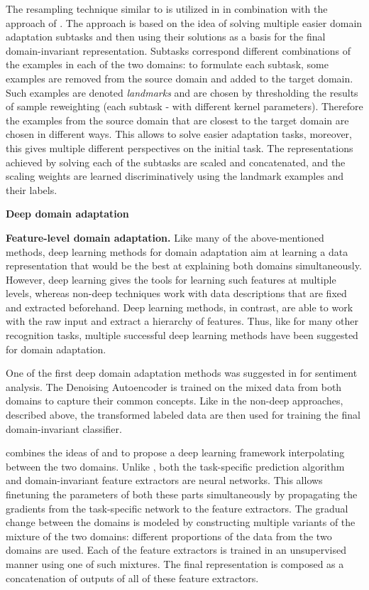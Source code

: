 The resampling technique similar to \citep{huang2007correcting} is utilized in \citep{gong2013connecting} in combination with the approach of \citep{gong2012geodesic}. The approach is based on the idea of solving multiple easier domain adaptation subtasks and then using their solutions as a basis for the final domain-invariant representation. Subtasks correspond different combinations of the examples in each of the two domains: to formulate each subtask, some examples are removed from the source domain and added to the target domain. Such examples are denoted \textit{landmarks} and are chosen by thresholding the results of sample reweighting (each subtask - with different kernel parameters). Therefore the examples from the source domain that are closest to the target domain are chosen in different ways. This allows to solve easier adaptation tasks, moreover, this gives multiple different perspectives on the initial task. The representations achieved by solving each of the subtasks are scaled and concatenated, and the scaling weights are learned discriminatively using the landmark examples and their labels.


\bigskip\ident\textbf{Deep domain adaptation}

\bigskip\ident\textbf{Feature-level domain adaptation.} Like many of the above-mentioned methods, deep learning methods for domain adaptation aim at learning a data representation that would be the best at explaining both domains simultaneously. However, deep learning gives the tools for learning such features at multiple levels, whereas non-deep techniques work with data descriptions that are fixed and extracted beforehand. Deep learning methods, in contrast, are able to work with the raw input and extract a hierarchy of features. Thus, like for many other recognition tasks, multiple successful deep learning methods have been suggested for domain adaptation. 

One of the first deep domain adaptation methods was suggested in \citep{glorot2011domain} for sentiment analysis. The Denoising Autoencoder \citep{vincent2008extracting} is trained on the mixed data from both domains to capture their common concepts. Like in the non-deep approaches, described above, the transformed labeled data are then used for training the final domain-invariant classifier.

\citep{chopra2013dlid} combines the ideas of \citep{gong2012geodesic} and \citep{glorot2011domain} to propose a deep learning framework interpolating between the two domains. Unlike \citep{glorot2011domain}, both the task-specific prediction algorithm and domain-invariant feature extractors are neural networks. This allows finetuning the parameters of both these parts simultaneously by propagating the gradients from the task-specific network to the feature extractors. The gradual change between the domains is modeled by constructing multiple variants of the mixture of the two domains: different proportions of the data from the two domains are used. Each of the feature extractors is trained in an unsupervised manner using one of such mixtures. The final representation is composed as a concatenation of outputs of all of these feature extractors.

